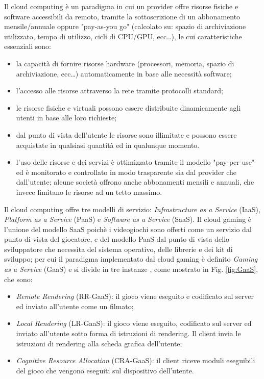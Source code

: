 Il cloud computing è un paradigma in cui un provider offre risorse fisiche e software accessibili da remoto, tramite la sottoscrizione di un abbonamento mensile/annuale oppure "pay-as-you go" (calcolato su: spazio di archiviazione utilizzato, tempo di utilizzo, cicli di CPU/GPU, ecc\dots), le cui caratteristiche essenziali sono:

\begin{itemize}
	\item la capacità di fornire risorse hardware (processori, memoria, spazio di archiviazione, ecc\dots) automaticamente in base alle necessità software;
	\item l'accesso alle risorse attraverso la rete tramite protocolli standard;
	\item le risorse fisiche e virtuali possono essere distribuite dinamicamente agli utenti in base alle loro richieste;
	\item dal punto di vista dell'utente le risorse sono illimitate e possono essere acquistate in qualsiasi quantità ed in qualunque momento.
	\item l'uso delle risorse e dei servizi è ottimizzato tramite il modello "pay-per-use" ed è monitorato e controllato in modo trasparente sia dal provider che dall'utente; alcune società offrono anche abbonamenti mensili e annuali, che invece limitano le risorse ad un tetto massimo.
\end{itemize}

Il cloud computing offre tre modelli di servizio: \textit{Infrastructure as a Service} (IaaS), \textit{Platform as a Service} (PaaS) e \textit{Software as a Service} (SaaS). Il cloud gaming è l'unione del modello SaaS poichè i videogiochi sono offerti come un servizio dal punto di vista del giocatore, e del modello PaaS dal punto di vista dello sviluppatore che necessita del sistema operativo, delle librerie e dei kit di sviluppo; per cui il paradigma implementato dal cloud gaming è definito \textit{Gaming as a Service} (GaaS) e si divide in tre instanze \parencite{Cloud_for_Gaming}, come mostrato in Fig. \ref{fig:GaaS}, che sono:

\begin{itemize}
	\item \textit{Remote Rendering} (RR-GaaS): il gioco viene eseguito e codificato sul server ed inviato all'utente come un filmato;
	\item \textit{Local Rendering} (LR-GaaS): il gioco viene eseguito, codificato sul server ed inviato all'utente sotto forma di istruzioni di rendering. Il client invia le istruzioni di rendering alla scheda grafica dell'utente;
	\item \textit{Cognitive Resource Allocation} (CRA-GaaS): il client riceve moduli eseguibili del gioco che vengono eseguiti sul dispositivo dell'utente.
\end{itemize}

